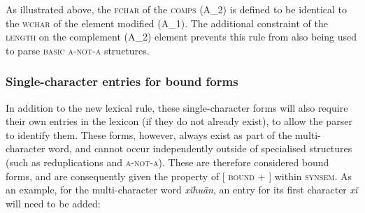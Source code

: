 \documentclass[12pt, UTF8]{article}
\begin{document}
As illustrated above, the \textsc{fchar} of the \textsc{comps} (\textsc{A_2}) is defined to be identical to the \textsc{wchar} of the element modified (\textsc{A_1}). The additional constraint of the \textsc{length} on the complement (\textsc{A_2}) element prevents this rule from also being used to parse \textsc{basic a-not-a} structures.



\subsubsection{Single-character entries for bound forms}
In addition to the new lexical rule, these single-character forms will also require their own entries in the lexicon (if they do not already exist), to allow the parser to identify them. These forms, however, always exist as part of the multi-character word, and cannot occur independently outside of specialised structures (such as reduplications and \textsc{a-not-a}). These are therefore considered bound forms, and are consequently given the property of [ \textsc{bound + }] within \textsc{synsem}. As an example, for the multi-character word \textit{x\v{i}hu\={a}n}, an entry for its first character \textit{x\v{i}} will need to be added:
\end{document}
